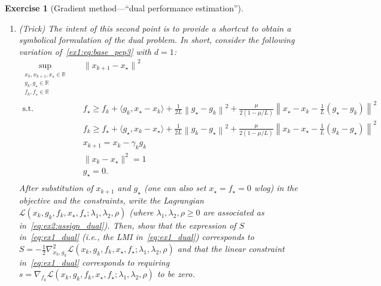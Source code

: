 \documentclass[11pt,a4paper]{article}
\newcommand{\normsq}[1]{{\left\lVert#1\right\rVert}^2}
\newcommand{\inner}[2]{{\langle #1, #2\rangle}}
\newtheorem{exercise}{Exercise}
\begin{document}
\begin{exercise}[Gradient method---``dual performance estimation'']
\begin{enumerate}
{\begin{equation}
	\begin{aligned}
	\min_{\lambda_1,\lambda_2,\rho\geqslant 0}& \rho\\
	\text{s.t. }& S\triangleq-(A_{\text{obj}}-\rho A_0-\lambda_1 A_1-\lambda_2 A_2)\succcurlyeq 0\\
	&s\triangleq -(a_{\text{obj}}-\rho a_0-\lambda_1a_1-\lambda_2 a_2)=0.
	\end{aligned}
	\end{equation}		
	Substituting the expressions for $A_i$'s and $a_i$'s above, one recovers~\eqref{eq:ex1_dual} (the expression of $S$ is also obtained by substituting the expression of $\lambda_2$).
	}
		\item (Trick) The intent of this second point is to provide a shortcut to obtain a symbolical formulation of the dual problem. In short, consider the following variation of~\eqref{ex1:eq:base_pep3} with $d=1$:
	\begin{equation}\label{ex2:eq:base_pep}
		\begin{aligned}
		\sup_{\substack{x_k,x_{k+1},x_\star\in\mathbb{R}\\g_k,g_\star\in\mathbb{R}\\f_k,f_\star\in\mathbb{R}}} \quad & {\|x_{k+1}-x_\star\|}^2\\
		\text{s.t. } & f_\star\geqslant f_k+\inner{g_k}{x_\star-x_k}+\tfrac{1}{2L}\normsq{g_\star-g_k}+\tfrac{\mu}{2(1-\mu/L)}\normsq{x_\star-x_k-\tfrac{1}{L}(g_\star-g_k)}\\
			&f_k\geqslant f_\star+\inner{g_\star}{x_k-x_\star}+\tfrac{1}{2L}\normsq{g_k-g_\star}+\tfrac{\mu}{2(1-\mu/L)}\normsq{x_k-x_\star-\tfrac{1}{L}(g_k-g_\star)}\\
		& x_{k+1}=x_k-\gamma_k  g_k\\
		& \|x_k-x_\star\|^2=1\\
		& g_\star=0.\\
		\end{aligned}
		\end{equation}
		After substitution of $x_{k+1}$ and $g_\star$ (one can also set $x_\star=f_\star=0$ wlog) in the objective and the constraints, write the Lagrangian $\mathcal{L}(x_k,g_k,f_k,x_\star,f_\star;\lambda_1,\lambda_2,\rho)$ (where $\lambda_1,\lambda_2,\rho\geqslant 0$ are associated as in~\eqref{eq:ex2:assign_dual}). Then, show that the expression of $S$ in~\eqref{eq:ex1_dual} (i.e., the LMI in~\eqref{eq:ex1_dual}) corresponds to $S=-\tfrac12\nabla^2_{x_k,g_k} \mathcal{L}(x_k,g_k,f_k,x_\star,f_\star;\lambda_1,\lambda_2,\rho)$ and that the linear constraint in~\eqref{eq:ex1_dual} corresponds to requiring $s=\nabla_{f_k} \mathcal{L}(x_k,g_k,f_k,x_\star,f_\star;\lambda_1,\lambda_2,\rho)$ to be zero.
		

\end{enumerate}
\end{exercise}
\end{document}
